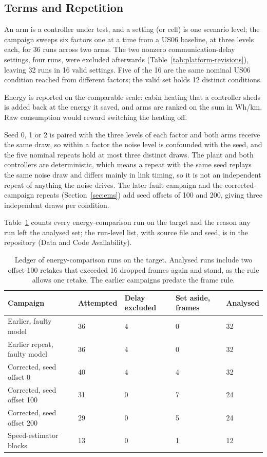 \documentclass{ieeeaccess}
\begin{document}
\subsection{Terms and Repetition}

An arm is a controller under test, and a setting (or cell) is one scenario level; the campaign sweeps six factors one at a time from a US06 baseline, at three levels each, for 36 runs across two arms. The two nonzero communication-delay settings, four runs, were excluded afterwards (Table~\ref{tab:platform-revisions}), leaving 32 runs in 16 valid settings. Five of the 16 are the same nominal US06 condition reached from different factors; the valid set holds 12 distinct conditions.

Energy is reported on the comparable scale: cabin heating that a controller sheds is added back at the energy it saved, and arms are ranked on the sum in Wh/km. Raw consumption would reward switching the heating off.

Seed 0, 1 or 2 is paired with the three levels of each factor and both arms receive the same draw, so within a factor the noise level is confounded with the seed, and the five nominal repeats hold at most three distinct draws. The plant and both controllers are deterministic, which means a repeat with the same seed replays the same noise draw and differs mainly in link timing, so it is not an independent repeat of anything the noise drives. The later fault campaign and the corrected-campaign repeats (Section~\ref{sec:ems}) add seed offsets of 100 and 200, giving three independent draws per condition.

Table~\ref{tab:platform-ledger} counts every energy-comparison run on the target and the reason any run left the analysed set; the run-level list, with source file and seed, is in the repository (Data and Code Availability).

\begin{table}[!t]
\centering
\caption{Ledger of energy-comparison runs on the target. Analysed runs include two offset-100 retakes that exceeded 16 dropped frames again and stand, as the rule allows one retake. The earlier campaigns predate the frame rule.}
\label{tab:platform-ledger}
\footnotesize
\setlength{\tabcolsep}{3pt}
\renewcommand{\arraystretch}{1.15}
\begin{tabularx}{\columnwidth}{@{}XXXXX@{}}
\hline
\textbf{Campaign} & \textbf{Attempted} & \textbf{Delay excluded} & \textbf{Set aside, frames} & \textbf{Analysed} \\
\hline
Earlier, faulty model & 36 & 4 & 0 & 32 \\
Earlier repeat, faulty model & 36 & 4 & 0 & 32 \\
Corrected, seed offset 0 & 40 & 4 & 4 & 32 \\
Corrected, seed offset 100 & 31 & 0 & 7 & 24 \\
Corrected, seed offset 200 & 29 & 0 & 5 & 24 \\
Speed-estimator blocks & 13 & 0 & 1 & 12 \\
\hline
\end{tabularx}
\end{table}
\end{document}
